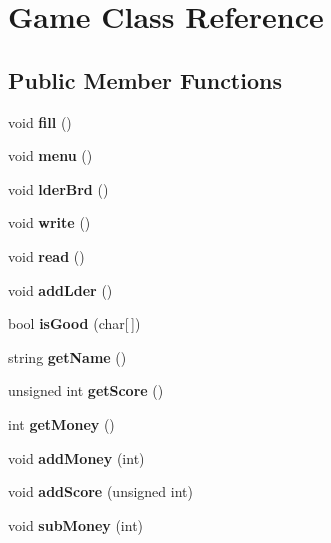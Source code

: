 \hypertarget{class_game}{}\section{Game Class Reference}
\label{class_game}
\subsection*{Public Member Functions}
\begin{DoxyCompactItemize}
\item 
\hypertarget{class_game_a49ded379e279ea868437560d8ac10fdb}{}\label{class_game_a49ded379e279ea868437560d8ac10fdb} 
void {\bfseries fill} ()
\item 
\hypertarget{class_game_a463932fa7ca2f1ce243279bf2422fc48}{}\label{class_game_a463932fa7ca2f1ce243279bf2422fc48} 
void {\bfseries menu} ()
\item 
\hypertarget{class_game_a01f5f6eebc3fe2d069c8e44227fb1b1e}{}\label{class_game_a01f5f6eebc3fe2d069c8e44227fb1b1e} 
void {\bfseries lder\+Brd} ()
\item 
\hypertarget{class_game_a75085a377fc907a1b988378434b01f19}{}\label{class_game_a75085a377fc907a1b988378434b01f19} 
void {\bfseries write} ()
\item 
\hypertarget{class_game_a109442fa16afc0dcb542d88a086aa5ed}{}\label{class_game_a109442fa16afc0dcb542d88a086aa5ed} 
void {\bfseries read} ()
\item 
\hypertarget{class_game_abe4a583fc8cbb16b634735a59a654e73}{}\label{class_game_abe4a583fc8cbb16b634735a59a654e73} 
void {\bfseries add\+Lder} ()
\item 
\hypertarget{class_game_a08052a1f1c2a02a44f3de00a334aff28}{}\label{class_game_a08052a1f1c2a02a44f3de00a334aff28} 
bool {\bfseries is\+Good} (char\mbox{[}$\,$\mbox{]})
\item 
\hypertarget{class_game_a5367d236c0f6d742b296847ab6eeefa0}{}\label{class_game_a5367d236c0f6d742b296847ab6eeefa0} 
string {\bfseries get\+Name} ()
\item 
\hypertarget{class_game_a72a1d876e0d3303c8911a0a7ea4f499f}{}\label{class_game_a72a1d876e0d3303c8911a0a7ea4f499f} 
unsigned int {\bfseries get\+Score} ()
\item 
\hypertarget{class_game_ae9b4f23f1e115d45f50703b01533678e}{}\label{class_game_ae9b4f23f1e115d45f50703b01533678e} 
int {\bfseries get\+Money} ()
\item 
\hypertarget{class_game_a74d0dca3ae7da72eccb6a3e9eaefc2c5}{}\label{class_game_a74d0dca3ae7da72eccb6a3e9eaefc2c5} 
void {\bfseries add\+Money} (int)
\item 
\hypertarget{class_game_a76486d4a6561979d42f460686237e50a}{}\label{class_game_a76486d4a6561979d42f460686237e50a} 
void {\bfseries add\+Score} (unsigned int)
\item 
\hypertarget{class_game_a57c81811f28e95c566bc6444f4c18999}{}\label{class_game_a57c81811f28e95c566bc6444f4c18999} 
void {\bfseries sub\+Money} (int)
\end{DoxyCompactItemize}
